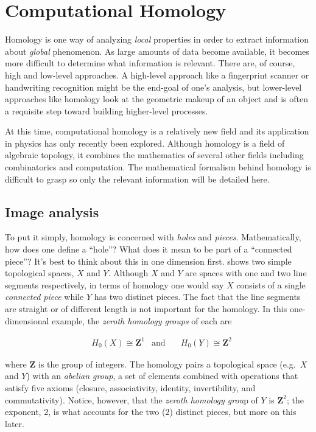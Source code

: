 \chapter{Computational Homology}

Homology is one way of analyzing \textit{local} properties in order to extract information about \textit{global} phenomenon. As large amounts of data become available, it becomes more difficult to determine what information is relevant. There are, of course, high and low-level approaches. A high-level approach like a fingerprint scanner or handwriting recognition might be the end-goal of one's analysis, but lower-level approaches like homology look at the geometric makeup of an object and is often a requisite step toward building higher-level processes.

	At this time, computational homology is a relatively new field and its application in physics has only recently been explored. Although homology is a field of algebraic topology, it combines the mathematics of several other fields including combinatorics and computation. The mathematical formalism behind homology is difficult to grasp so only the relevant information will be detailed here.
	
\section{Image analysis}

To put it simply, homology is concerned with \textit{holes} and \textit{pieces}. Mathematically, how does one define a ``hole''? What does it mean to be part of a ``connected piece''? It's best to think about this in one dimension first.  shows two simple topological spaces, $X$ and $Y$. Although $X$ and $Y$ are spaces with one and two line segments respectively, in terms of homology one would say $X$ consists of a single \textit{connected piece} while $Y$ has two distinct pieces. The fact that the line segments are straight or of different length is not important for the homology. In this one-dimensional example, the \textit{zeroth homology groups} of each are

\begin{align}
	& H_0(X) \cong \mathbf{Z}^1  & \text{and} & \quad H_0(Y) \cong \mathbf{Z}^2
	\label{eq:homology1d}
\end{align}

where $\mathbf{Z}$ is the group of integers. The homology pairs a topological space (e.g.\ $X$ and $Y$) with an \textit{abelian group}, a set of elements combined with operations that satisfy five axioms (closure, associativity, identity, invertibility, and commutativity). Notice, however, that the \textit{zeroth homology grou}p of $Y$ is $\mathbf{Z}^2$; the exponent, $2$, is what accounts for the two ($2$) distinct pieces, but more on this later.

